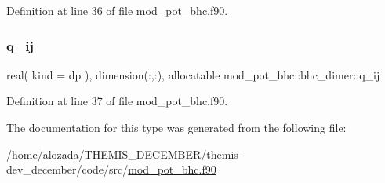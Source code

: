 Definition at line 36 of file mod\+\_\+pot\+\_\+bhc.\+f90.

\mbox{\label{structmod__pot__bhc_1_1bhc__dimer_a7f3af112e6df0fc8af639f4f2036307b}} 
\subsubsection{\texorpdfstring{q\+\_\+ij}{q\_ij}}
{\footnotesize\ttfamily real( kind = dp ), dimension(\+:,\+:), allocatable mod\+\_\+pot\+\_\+bhc\+::bhc\+\_\+dimer\+::q\+\_\+ij}



Definition at line 37 of file mod\+\_\+pot\+\_\+bhc.\+f90.



The documentation for this type was generated from the following file\+:\begin{DoxyCompactItemize}
\item 
/home/alozada/\+T\+H\+E\+M\+I\+S\+\_\+\+D\+E\+C\+E\+M\+B\+E\+R/themis-\/dev\+\_\+december/code/src/\hyperlink{mod__pot__bhc_8f90}{mod\+\_\+pot\+\_\+bhc.\+f90}\end{DoxyCompactItemize}
